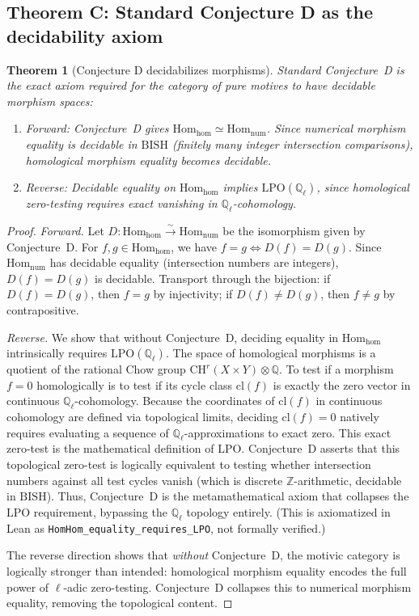 \documentclass[11pt]{article}
\newtheorem{theorem}{Theorem}[section]
\theoremstyle{definition}
\theoremstyle{remark}
\newcommand{\Z}{\mathbb{Z}}
\newcommand{\Q}{\mathbb{Q}}
\newcommand{\Qell}{\Q_\ell}
\newcommand{\LPO}{\mathrm{LPO}}
\newcommand{\BISH}{\mathrm{BISH}}
\begin{document}
\subsection{Theorem C: Standard Conjecture D as the decidability axiom}

\begin{theorem}[Conjecture D decidabilizes morphisms]
\label{thm:C}
Standard Conjecture~D is the exact axiom required for the category of pure motives to have decidable morphism spaces:
\begin{enumerate}
\item \emph{Forward:} Conjecture~D gives $\mathrm{Hom}_{\mathrm{hom}} \simeq \mathrm{Hom}_{\mathrm{num}}$. Since numerical morphism equality is decidable in $\BISH$ (finitely many integer intersection comparisons), homological morphism equality becomes decidable.
\item \emph{Reverse:} Decidable equality on $\mathrm{Hom}_{\mathrm{hom}}$ implies $\LPO(\Qell)$, since homological zero-testing requires exact vanishing in $\Qell$-cohomology.
\end{enumerate}
\end{theorem}

\begin{proof}
\emph{Forward.} Let $D : \mathrm{Hom}_{\mathrm{hom}} \xrightarrow{\sim} \mathrm{Hom}_{\mathrm{num}}$ be the isomorphism given by Conjecture~D. For $f, g \in \mathrm{Hom}_{\mathrm{hom}}$, we have $f = g \iff D(f) = D(g)$. Since $\mathrm{Hom}_{\mathrm{num}}$ has decidable equality (intersection numbers are integers), $D(f) = D(g)$ is decidable. Transport through the bijection: if $D(f) = D(g)$, then $f = g$ by injectivity; if $D(f) \neq D(g)$, then $f \neq g$ by contrapositive.

\emph{Reverse.} We show that without Conjecture~D, deciding equality in $\mathrm{Hom}_{\mathrm{hom}}$ intrinsically requires $\LPO(\Qell)$. The space of homological morphisms is a quotient of the rational Chow group $\mathrm{CH}^r(X \times Y) \otimes \Q$. To test if a morphism $f = 0$ homologically is to test if its cycle class $\mathrm{cl}(f)$ is exactly the zero vector in continuous $\Qell$-cohomology. Because the coordinates of $\mathrm{cl}(f)$ in continuous cohomology are defined via topological limits, deciding $\mathrm{cl}(f) = 0$ natively requires evaluating a sequence of $\Qell$-approximations to exact zero. This exact zero-test is the mathematical definition of $\LPO$. Conjecture~D asserts that this topological zero-test is logically equivalent to testing whether intersection numbers against all test cycles vanish (which is discrete $\Z$-arithmetic, decidable in $\BISH$). Thus, Conjecture~D is the metamathematical axiom that collapses the $\LPO$ requirement, bypassing the $\Qell$ topology entirely. (This is axiomatized in Lean as \texttt{HomHom\_equality\_requires\_LPO}, not formally verified.)

The reverse direction shows that \emph{without} Conjecture~D, the motivic category is logically stronger than intended: homological morphism equality encodes the full power of $\ell$-adic zero-testing. Conjecture~D collapses this to numerical morphism equality, removing the topological content.
\end{proof}
\end{document}

